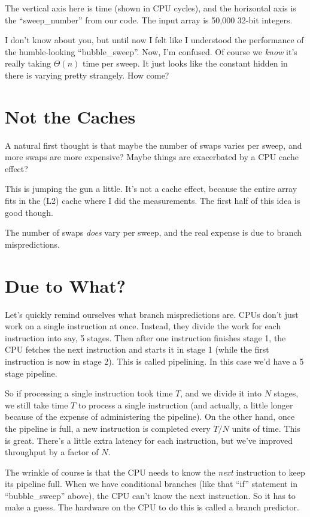 \documentclass[11pt]{article}
\begin{document}
The vertical axis here is time (shown in CPU cycles), and the horizontal axis is the ``sweep\_number'' from our code. The input array is 50,000 32-bit integers.

I don't know about you, but until now I felt like I understood the performance of the humble-looking ``bubble\_sweep''. Now, I'm confused. Of course we \emph{know} it's really taking $\Theta(n)$ time per sweep. It just looks like the constant hidden in there is varying pretty strangely. How come?

\section{Not the Caches}

A natural first thought is that maybe the number of swaps varies per sweep, and more swaps are more expensive? Maybe things are exacerbated by a CPU cache effect?

This is jumping the gun a little. It's not a cache effect, because the entire array fits in the (L2) cache where I did the measurements. The first half of this idea is good though.

The number of swaps \emph{does} vary per sweep, and the real expense is due to branch mispredictions.

\section{Due to What?}

Let's quickly remind ourselves what branch mispredictions are. CPUs don't just work on a single instruction at once. Instead, they divide the work for each instruction into say, 5 stages. Then after one instruction finishes stage 1, the CPU fetches the next instruction and starts it in stage 1 (while the first instruction is now in stage 2). This is called pipelining. In this case we'd have a 5 stage pipeline. 

So if processing a single instruction took time $T$, and we divide it into $N$ stages, we still take time $T$ to process a single instruction (and actually, a little longer because of the expense of administering the pipeline). On the other hand, once the pipeline is full, a new instruction is completed every $T/N$ units of time. This is great. There's a little extra latency for each instruction, but we've improved throughput by a factor of $N$. 

The wrinkle of course is that the CPU needs to know the \emph{next} instruction to keep its pipeline full. When we have conditional branches (like that ``if'' statement in ``bubble\_sweep'' above), the CPU can't know the next instruction. So it has to make a guess. The hardware on the CPU to do this is called a branch predictor.
\end{document}
